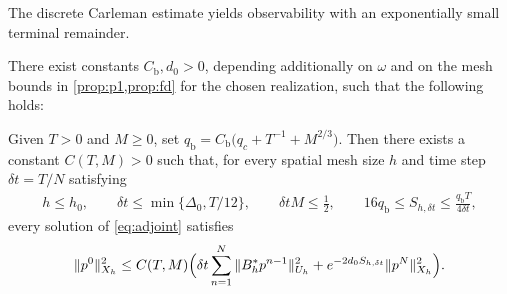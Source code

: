 \documentclass[print,wide,eng]{draft}
\begin{document}
The discrete Carleman estimate yields observability with an exponentially small terminal remainder.
%
\begin{theorem}\label{prop:physicalO}
There exist constants $C_{\mathrm b},d_0>0$, depending additionally on $\omega$ and on the mesh bounds in \cref{prop:p1,prop:fd} for the chosen realization, such that the following holds:

Given $T>0$ and $M\ge0$, set
$
q_{\mathrm b}=C_{\mathrm b}\bigl(q_c+T^{-1}+M^{2/3}\bigr)$.
Then there exists a constant $C(T,M)>0$ such that, for every spatial mesh size $h$ and time step $\delta t=T/N$ satisfying
%
\begin{align}\label{eq:physicalconditions}
h\le h_0,\qquad
\delta t\le\min\{\Delta_0,T/12\},\qquad
\delta t M\le\tfrac12,\qquad
16q_{\mathrm b}\le S_{h,\delta t}\le\frac{q_{\mathrm b}T}{4\delta t},
\end{align}
%
every solution of \cref{eq:adjoint} satisfies
%
\begin{align}\label{eq:mainO}
\|p^0\|_{X_h}^2
\le C(T,M)\Bigl(
\delta t\sum_{n=1}^N\|B_h^*p^{n-1}\|_{U_h}^2
+e^{-2d_0S_{h,\delta t}}\|p^N\|_{X_h}^2\Bigr).
\end{align}
%
\end{theorem}
%
\end{document}
